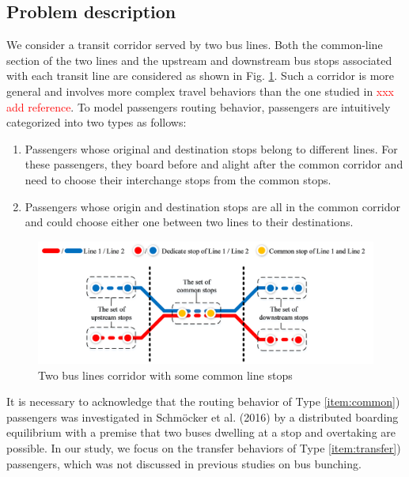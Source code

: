 \documentclass[smallextended]{svjour3}       %
\begin{document}
\begin{Abstract}
\section{Problem description}\label{Problem description}
We consider a transit corridor served by two bus lines. Both the common-line section of the two lines and the upstream and downstream bus stops associated with each transit line are considered as shown in Fig. \ref{fig:Fig1}. Such a corridor is more general and involves more complex travel behaviors than the one studied in \textcolor{red}{xxx add reference}. To model passengers routing behavior, passengers are intuitively categorized into two types as follows:

\begin{enumerate}[Type I)]
    \item \label{item:transfer}Passengers whose original and destination stops belong to different lines. 
    For these passengers, they board before and alight after the common corridor and need to choose their interchange stops from the common stops.
    \item \label{item:common}Passengers whose origin and destination stops are all in the common corridor 
    and could choose either one between two lines to their destinations.
\end{enumerate}

\begin{figure}[H] 
  \centering 
  \includegraphics[width=0.9\linewidth]{CASPT2021paper_fig/Fig1.png} 
  \caption{Two bus lines corridor with some common line stops} 
  \label{fig:Fig1} 
\end{figure}

It is necessary to acknowledge that the routing behavior of Type \ref{item:common}) passengers was investigated 
in \textrm{Schmöcker et al. (2016)} by a distributed boarding equilibrium with a premise that two buses dwelling at a stop and overtaking are possible.
In our study, we focus on the transfer behaviors of Type \ref{item:transfer}) passengers, which was not discussed in previous studies on bus bunching.

\end{Abstract}
\end{document}
